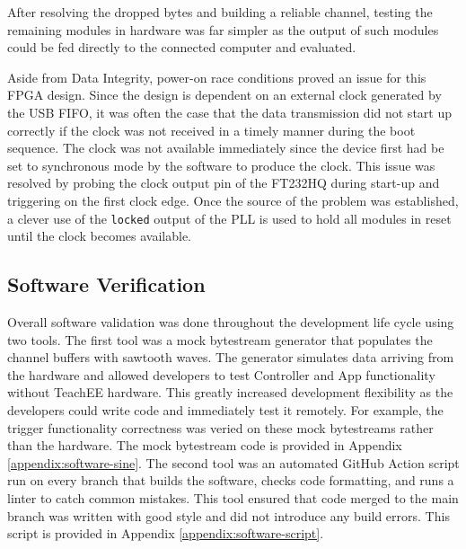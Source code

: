 \documentclass[letterpaper,11pt]{article}
\newcommand{\code}[1]{\texttt{#1}}
\begin{document}
After resolving the dropped bytes and building a reliable channel, testing the
remaining modules in hardware was far simpler as the output of such modules
could be fed directly to the connected computer and evaluated.

Aside from Data Integrity, power-on race conditions proved an issue for this
FPGA design. Since the design is dependent on an external clock generated by the
USB FIFO, it was often the case that the data transmission did not start up
correctly if the clock was not received in a timely manner during the boot
sequence. The clock was not available immediately since the device first had be
set to synchronous mode by the software to produce the clock. This issue was
resolved by probing the clock output pin of the FT232HQ during start-up and
triggering on the first clock edge. Once the source of the problem was
established, a clever use of the \code{locked} output of the PLL is used to hold
all modules in reset until the clock becomes available.

\subsection{Software Verification} %
Overall software validation was done throughout the development life cycle using
two tools. The first tool was a mock bytestream generator that populates the channel
buffers with sawtooth waves. The generator simulates data arriving from the hardware
and allowed developers to test Controller and App functionality without TeachEE
hardware. This greatly increased development flexibility as the developers could
write code and immediately test it remotely. For example, the trigger functionality
correctness was veried on these mock bytestreams rather than the hardware. The mock
bytestream code is provided in Appendix \ref{appendix:software-sine}. The
second tool was an automated GitHub Action script run on every branch that builds the
software, checks code formatting, and runs a linter to catch common mistakes. This
tool ensured that code merged to the main branch was written with good style and did
not introduce any build errors. This script is provided in Appendix
\ref{appendix:software-script}.
\end{document}
